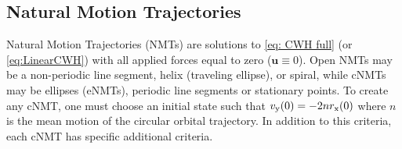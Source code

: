 \documentclass[twocolumn,letterpaper]{IEEEAerospaceCLS}  %
\theoremstyle{definition}
\begin{document}


\subsection{Natural Motion Trajectories}
Natural Motion Trajectories (NMTs) are solutions to \eqref{eq: CWH full} (or \eqref{eq:LinearCWH}) with all applied forces equal to zero ($\boldsymbol{u}\equiv0$). 
Open NMTs may be a non-periodic line segment, helix (traveling ellipse), or spiral, while cNMTs may be ellipses (eNMTs), periodic line segments or stationary points. %
To create any cNMT, one must choose an initial state 
such that
$v_{\rm y}(0) = -2 n r_{\rm x}(0)$ where $n$ is the mean motion of the circular orbital trajectory. In addition to this criteria, each cNMT has specific additional criteria. 
\end{document}
